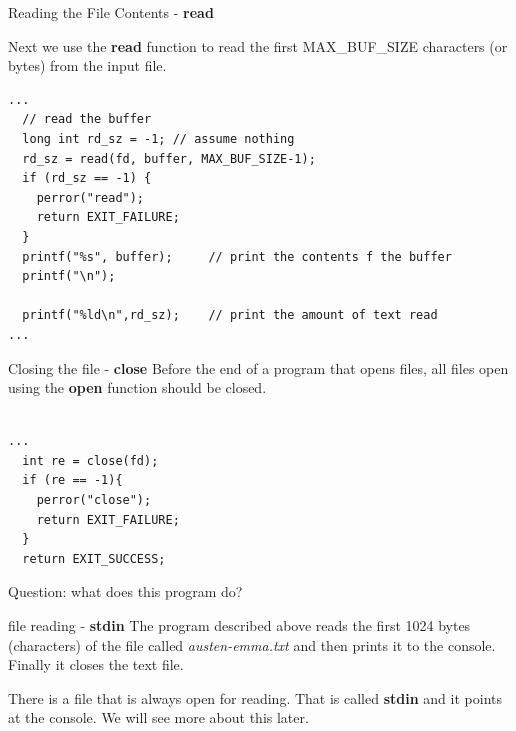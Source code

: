 \documentclass[10pt]{beamer}
\begin{document}
\begin{frame}[fragile]{Reading the File Contents - \textbf{read}}

Next we use the \textbf{read} function to read the first MAX\_BUF\_SIZE characters (or bytes) from the input file.
\begin{verbatim}
...
  // read the buffer
  long int rd_sz = -1; // assume nothing
  rd_sz = read(fd, buffer, MAX_BUF_SIZE-1);
  if (rd_sz == -1) {
    perror("read");
    return EXIT_FAILURE;
  } 
  printf("%s", buffer);     // print the contents f the buffer
  printf("\n");
  
  printf("%ld\n",rd_sz);    // print the amount of text read
...

\end{verbatim}

\end{frame}
\begin{frame}[fragile]{Closing the file - \textbf{close}}
Before the end of a program that opens files, all files open using the \textbf{open} function should be closed.
\begin{verbatim}

...
  int re = close(fd);
  if (re == -1){
    perror("close");
    return EXIT_FAILURE;
  }
  return EXIT_SUCCESS;
\end{verbatim}

Question: what does this program do?
\end{frame}
\begin{frame}[fragile]{file reading - \textbf{stdin}}
The program described above reads the first 1024 bytes (characters) of the file called \textit{austen-emma.txt} and then prints it to the console.  Finally it closes the text file.

There is a file that is always open for reading.  That is called \textbf{stdin} and it points at the console.  We will see more about this later.

\end{frame}
\end{document}
